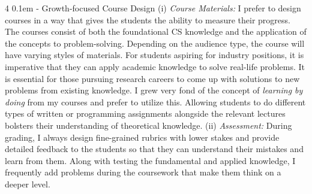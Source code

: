 \documentclass[10pt]{article}
\makeatletter
\def \paragraph {%
    \@startsection{paragraph}%
        {4}%
        \z@%
        {0.1em}
        {-\fontdimen 6 \font}%
        {\normalfont \bfseries}%
    }
\makeatother
\begin{document}
\paragraph{Growth-focused Course Design}
(i) \textit{Course Materials:} I prefer to design courses in a way that gives the students the ability to measure their progress. 
%
The courses consist of both the foundational CS knowledge and the application of the concepts to problem-solving. Depending on the audience type, 
the course will have varying styles of materials.
For students aspiring for industry positions, it is imperative that they can apply academic knowledge to solve real-life problems. It is essential for those pursuing research careers to come up with solutions to new problems from existing knowledge.
I grew very fond of the concept of \textit{learning by doing} from my courses and prefer to utilize this. Allowing students to do different types of written or programming assignments alongside the relevant lectures bolsters their understanding of theoretical knowledge.
%
%
(ii) \textit{Assessment:} During grading, I always design fine-grained rubrics with lower stakes and provide detailed feedback to the students so that they can understand their mistakes and learn from them. Along with testing the fundamental and applied knowledge, I frequently add problems during the coursework that make them think on a deeper level. 

\end{document}
